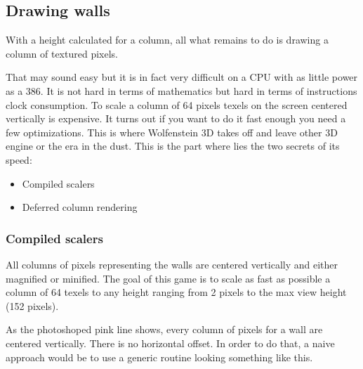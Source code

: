  \begin{minipage}{\textwidth}
 
\centering
\vspace*{0.5cm}
\centering


 \end{minipage}


 \par
 
 \begin{minipage}{\textwidth}
\centering
\vspace*{0.5cm}
\centering
\end{minipage}











\subsection{Drawing walls}
With a height calculated for a column, all what remains to do is drawing a column of textured pixels.\\
\par
That may sound easy but it is in fact very difficult on a CPU with as little power as a 386. It is not hard in terms of mathematics but hard in terms of instructions clock consumption. To scale a column of 64 pixels texels on the screen centered vertically is expensive. It turns out if you want to do it fast enough you need a few optimizations. This is where Wolfenstein 3D takes off and leave other 3D engine or the era in the dust. This is the part where lies the two secrets of its speed:
\begin{itemize}
\item Compiled scalers
\item Deferred column rendering
\end{itemize}
\par

\subsubsection{Compiled scalers}
All columns of pixels representing the walls are centered vertically and either magnified or minified. The goal of this game is to scale as fast as possible a column of 64 texels to any height ranging from 2 pixels to the max view height (152 pixels).\\
\par
 \begin{figure}[H]
\centering
 \end{figure}
\par
As the photoshoped pink line shows, every column of pixels for a wall are centered vertically. There is no horizontal offset. In order to do that, a naive approach would be to use a generic routine looking something like this.\\


